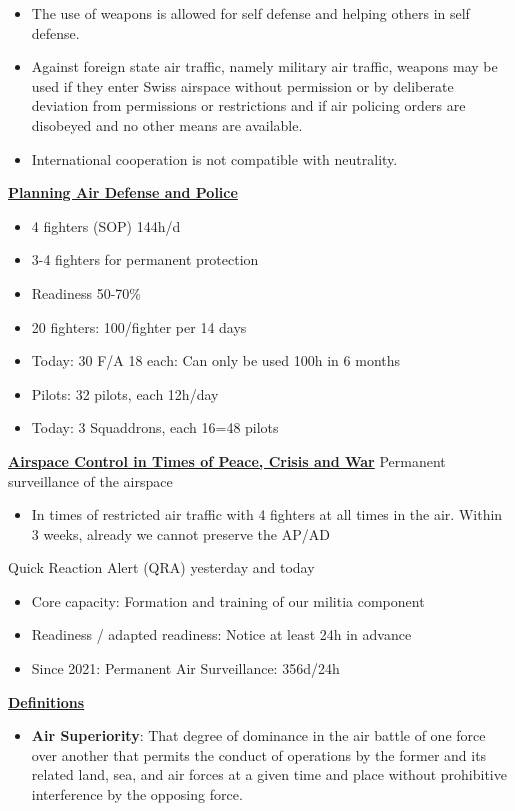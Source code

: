 \documentclass[9pt, landscape, fleqn]{scrartcl}
\begin{document}
\begin{multicols*}{3}
\begin{itemize}
    \item The use of weapons is allowed for self defense and helping others in self defense.
    \item Against foreign state air traffic, namely military air traffic, weapons may be used if they enter Swiss airspace without permission or by deliberate deviation from permissions or restrictions and if air policing orders are disobeyed and no other means are available.
    \item International cooperation is not compatible with neutrality.
\end{itemize}
\underline{\textbf{Planning Air Defense and Police}}
\begin{itemize}
    \item 4 fighters (SOP) 144h/d
    \item 3-4 fighters for permanent protection
    \item Readiness 50-70\%
    \item 20 fighters: 100/fighter per 14 days 
    \item Today: 30 F/A 18 each: Can only be used 100h in 6 months 
    \item Pilots: 32 pilots, each 12h/day
    \item Today: 3 Squaddrons, each 16=48 pilots 
\end{itemize}
\underline{\textbf{Airspace Control in Times of Peace, Crisis and War}}
Permanent surveillance of the airspace
\begin{itemize}
    \item In times of restricted air traffic with 4 fighters at all times in the air. Within 3 weeks, already we cannot preserve the AP/AD
\end{itemize}
Quick Reaction Alert (QRA) yesterday and today
\begin{itemize}
    \item Core capacity: Formation and training of our militia component 
    \item Readiness / adapted readiness: Notice at least 24h in advance 
    \item Since 2021: Permanent Air Surveillance: 356d/24h
\end{itemize}
\underline{\textbf{Definitions}}
\begin{itemize}
    \item \textbf{Air Superiority}: That degree of dominance in the air battle of one force over another that permits the conduct of operations by the former and its related land, sea, and air forces at a given time and place without prohibitive interference by the opposing force.

\end{itemize}
\end{multicols*}
\end{document}
